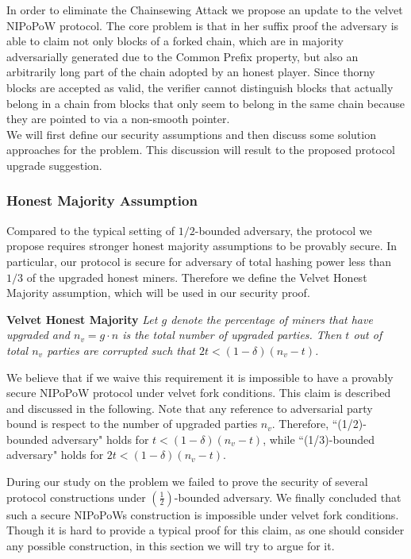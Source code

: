 In order to eliminate the Chainsewing Attack we propose an update to the velvet
NIPoPoW protocol. The core problem is that in her suffix proof the adversary
is able to claim not only blocks of a forked chain,  which are in majority adversarially
generated due to the Common Prefix property, but also an arbitrarily long part of the
chain adopted by an honest player. Since thorny blocks are accepted as valid,
the verifier cannot distinguish blocks that actually belong in a chain from
blocks that only seem to belong in the same chain because they are pointed to
via a non-smooth pointer. \\

We will first define our security assumptions and then discuss some solution
approaches for the problem. This discussion will result to the proposed protocol
upgrade suggestion.

\subsubsection{Honest Majority Assumption}
Compared to the typical setting of $1/2$-bounded adversary, the protocol we
propose requires stronger honest majority assumptions to be provably secure. 
In particular, our protocol is secure for adversary of total hashing power 
less than $1/3$ of the upgraded honest miners. Therefore we define the Velvet
Honest Majority assumption, which will be used in our security proof.

\begin{defn}{\textbf{Velvet Honest Majority}}
	\textit{Let $g$ denote the percentage of miners that have upgraded and $n_v = g
	\cdot n$ is the total number of upgraded parties. Then $t$ out of total $n_v$
	parties are corrupted such that $2t < (1 - \delta)(n_v-t)$. }
	\label{defn:smooth_pointer}
\end{defn}
We believe that if we waive this requirement it is impossible to have a provably 
secure NIPoPoW protocol under velvet fork conditions.
This claim is described and discussed in the following.
Note that any reference to adversarial party bound is respect to the number of
upgraded parties $n_v$. Therefore, ``(1/2)-bounded adversary" holds for
$t < (1 - \delta)(n_v - t)$, while ``(1/3)-bounded adversary" holds for
$2t < (1 - \delta)(n_v - t)$.

During our study on the problem we failed to prove the security of several protocol
constructions under $(\frac{1}{2})$-bounded adversary. We finally concluded that
such a secure NIPoPoWs construction is impossible under velvet fork conditions.
Though it is hard to provide a typical proof for this claim, as one should consider
any possible construction, in this section we will try to argue for it.

